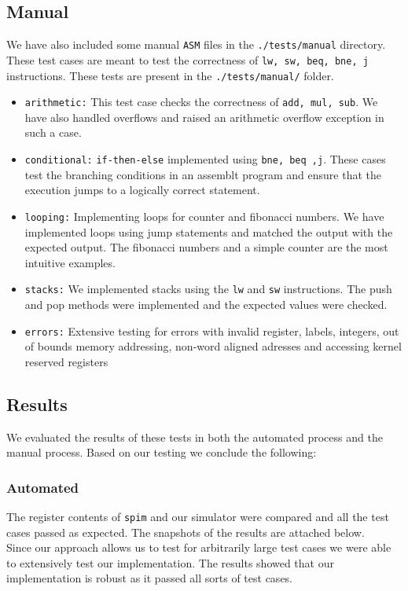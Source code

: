 \documentclass[hidelinks,12pt]{article}
\begin{document}
\subsection{Manual}
We have also included some manual \verb|ASM| files in the \verb|./tests/manual| directory. These test cases are meant to test the correctness of \verb|lw, sw, beq, bne, j| instructions.
These tests are present in the \verb|./tests/manual/| folder.
\begin{itemize}
    \item \verb|arithmetic:| This test case checks the correctness of \verb|add, mul, sub|. We have also handled overflows and raised an arithmetic overflow exception in such a case.
    \item \verb|conditional:| \verb|if-then-else| implemented using \verb|bne, beq ,j|. These cases test the branching conditions in an assemblt program and ensure that the execution jumps to a logically correct statement.
    \item \verb|looping:| Implementing loops for counter and fibonacci numbers. We have implemented loops using jump statements and matched the output with the expected output. The fibonacci numbers and a simple counter are the most intuitive examples.
    \item \verb|stacks:| We implemented stacks using the \verb|lw| and \verb|sw| instructions. The push and pop methods were implemented and the expected values were checked.
    \item \verb|errors:| Extensive testing for errors with invalid register, labels, integers, out of bounds memory addressing,
          non-word aligned adresses and accessing kernel reserved registers
\end{itemize}

\subsection{Results}
We evaluated the results of these tests in both the automated process and the manual process. Based on our testing we conclude the following:
\subsubsection{Automated}
The register contents of \verb|spim| and our simulator were compared and all the test cases passed as expected. The snapshots of the results are attached below.\\

Since our approach allows us to test for arbitrarily large test cases we were able to extensively test our implementation. The results showed that our implementation is robust as it passed all sorts of test cases.\\
\end{document}

